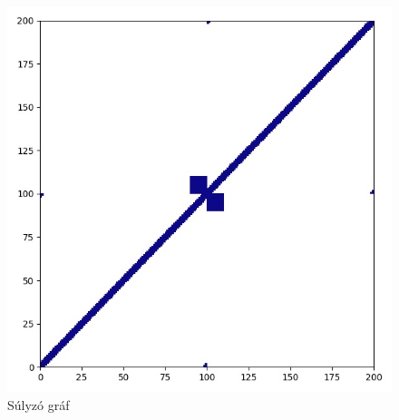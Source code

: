 \begin{figure}[H]
  \centering
  \includegraphics[width=0.5\linewidth]{./figures/sulyzo/graph.jpg}
  \caption{Súlyzó gráf}
\end{figure}

